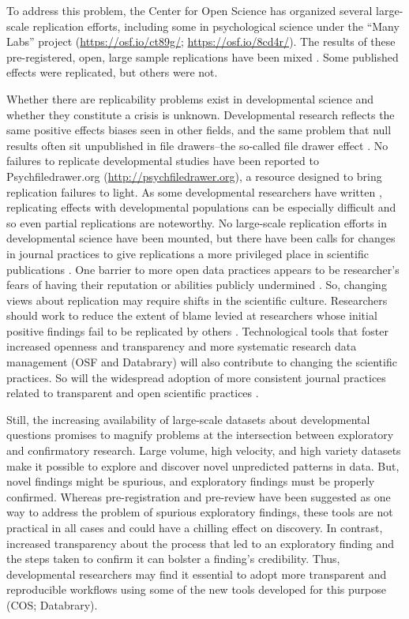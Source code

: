 \documentclass[letterpaper,man,apacite,natbib]{apa6}
\begin{document}
To address this problem, the Center for Open Science has organized several large-scale replication efforts, including some in psychological science under the ``Many Labs'' project (\url{https://osf.io/ct89g/}; \url{https://osf.io/8cd4r/}).
The results of these pre-registered, open, large sample replications have been mixed \cite{collaboration_estimating_2015}.
Some published effects were replicated, but others were not.

Whether there are replicability problems exist in developmental science and whether they constitute a crisis is unknown.
Developmental research reflects the same positive effects biases seen in other fields, and the same problem that null results often sit unpublished in file drawers--the so-called file drawer effect \cite{rosenthal_file_1979}.
No failures to replicate developmental studies have been reported to Psychfiledrawer.org (\url{http://psychfiledrawer.org}), a resource designed to bring replication failures to light.
As some developmental researchers have written \cite{bishop-blog-2012}, replicating effects with developmental populations can be especially difficult and so even partial replications are noteworthy.
No large-scale replication efforts in developmental science have been mounted, but there have been calls for changes in journal practices to give replications a more privileged place in scientific publications \cite{bishop-blog-2012}.
One barrier to more open data practices appears to be researcher's fears of having their reputation or abilities publicly undermined \cite{ascoli_ups_2006}.
So, changing views about replication may require shifts in the scientific culture.
Researchers should work to reduce the extent of blame levied at researchers whose initial positive findings fail to be replicated by others \cite{bishop-blog-2015}.
Technological tools that foster increased openness and transparency and more systematic research data management (OSF and Databrary) will also contribute to changing the scientific practices.
So will the widespread adoption of more consistent journal practices related to transparent and open scientific practices \cite{nosek_promoting_2015}.

Still, the increasing availability of large-scale datasets about developmental questions promises to magnify problems at the intersection between exploratory and confirmatory research.
Large volume, high velocity, and high variety datasets make it possible to explore and discover novel unpredicted patterns in data.
But, novel findings might be spurious, and exploratory findings must be properly confirmed.
Whereas pre-registration and pre-review have been suggested as one way to address the problem of spurious exploratory findings, these tools are not practical in all cases and could have a chilling effect on discovery.
In contrast, increased transparency about the process that led to an exploratory finding and the steps taken to confirm it can bolster a finding's credibility.
Thus, developmental researchers may find it essential to adopt more transparent and reproducible workflows using some of the new tools developed for this purpose (COS; Databrary).
\end{document}
